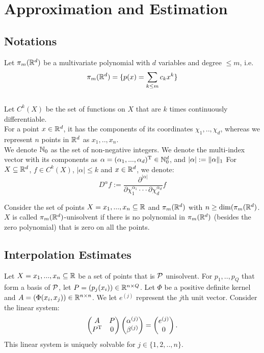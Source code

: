 \documentclass[twoside]{memoir}
\begin{document}
\chapter{Approximation and Estimation}
	\section{Notations} \label{sec:Notations}
	
	Let $\pi_m(\mathbb{R}^d)$ be a multivariate polynomial with $d$ variables and degree $\leq m$, i.e. 
	\[ \pi_m(\mathbb{R}^d) = \{ p(x) = \sum_{k \leq m} c_k x^k \} \] 	
	\\
	Let $C^k(X)$ be the set of functions on $X$ that are $k$ times continuously differentiable. \\
	For a point $x \in \mathbb{R}^d$, it has the components of its coordinates $\chi_1, .., \chi_d$, whereas we represent $n$ points in $\mathbb{R}^d$ as $x_1, .., x_n$.\\
	We denote $\mathbb{N}_0$ as the set of non-negative integers.
	We denote the multi-index vector with its components as $\alpha = (\alpha_1, ..., \alpha_d)^{\text{T}} \in \mathbb{N}_{0}^{d}$, and $|\alpha| := \lVert\alpha\rVert_1$ For $X \subseteq \mathbb{R}^d$, $f \in C^k(X)$, $|\alpha| \leq k$ and $x \in \mathbb{R}^d$, we denote:
	\[ D^\alpha f := \frac{\partial^{|\alpha|}}{\partial\chi_1^{\alpha_1} \cdot\cdot\cdot \partial\chi_d^{\alpha_d}} f \]
	
	\begin{defn}
		Consider the set of points $X = {x_1, ..., x_n} \subseteq \mathbb{R}$ and $\pi_m(\mathbb{R}^d)$ with $n \geq \dim(\pi_m(\mathbb{R}^d)$. $X$ is called $\pi_m(\mathbb{R}^d)$-unisolvent if there is no polynomial in $\pi_m(\mathbb{R}^d)$ (besides the zero polynomial) that is zero on all the points.
	\end{defn}

	
	\section{Interpolation Estimates}
	
	Let $X = {x_1, ..., x_n} \subseteq \mathbb{R}$  be a set of points that is $\mathcal{P}$ unisolvent. For $p_1, .., p_Q$ that form a basis of $\mathcal{P}$, let $P = (p_j(x_i)) \in \mathbb{R}^{n\times Q}$. Let $\Phi$ be a positive definite kernel and $A = (\Phi(x_i, x_j)) \in \mathbb{R}^{n\times n}$. We let $e^{(j)}$ represent the $j$th unit vector.
	Consider the linear system:
	\begin{equation} \label{eqn:InterpolateMat}
	\begin{pmatrix}
	A & P \\
	P^{\text{T}} & 0 \\
	\end{pmatrix}
	\begin{pmatrix}
	\alpha^{(j)} \\ \beta^{(j)}
	\end{pmatrix}
	=
	\begin{pmatrix}
	e^{(j)} \\ 0
	\end{pmatrix}.
	\end{equation}
	This linear system is uniquely solvable for $j \in \{1, 2, .., n\}$.
	
\end{document}
